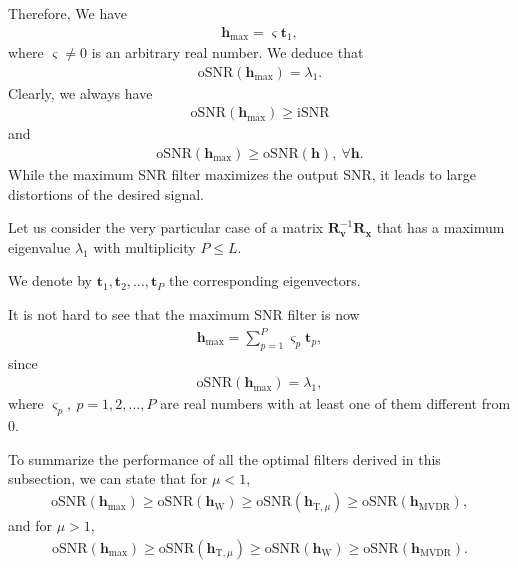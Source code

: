 \documentclass[10pt,pdflatex,headrule,landscape]{beamer}
\begin{document}
\begin{frame}[allowframebreaks]

Therefore, We have
\begin{eqnarray}
\label{C2-maxSNR-filt}
 \mathbf{h}_{\mathrm{max}} = \varsigma \mathbf{t}_1 ,
\end{eqnarray}
where $\varsigma \neq 0$ is an arbitrary real number. We deduce that
\begin{eqnarray}
 \mathrm{oSNR}\left( \mathbf{h}_{\mathrm{max}} \right) = \lambda_1 .
\end{eqnarray}
Clearly, we always have
\begin{eqnarray}
 \mathrm{oSNR}\left( \mathbf{h}_{\mathrm{max}} \right) \geq \mathrm{iSNR}
\end{eqnarray}
and
\begin{eqnarray}
 \mathrm{oSNR}\left( \mathbf{h}_{\mathrm{max}} \right) \geq \mathrm{oSNR}\left( \mathbf{h} \right), \ \forall \mathbf{h}.
\end{eqnarray}
While the maximum SNR filter maximizes the output SNR, it leads to large distortions of the desired signal.

Let us consider the very particular case of a matrix $\mathbf{R}_{\mathbf{v}}^{-1} \mathbf{R}_{\mathbf{x}}$ that has a maximum eigenvalue $\lambda_1$ with multiplicity $P \leq L$.

We denote by $\mathbf{t}_1, \mathbf{t}_2, \ldots, \mathbf{t}_P$ the corresponding eigenvectors.

It is not hard to see that the maximum SNR filter is now
\begin{eqnarray}
\label{C2-maxSNR-filt-P}
 \mathbf{h}_{\mathrm{max}} = \sum_{p=1}^P \varsigma_p \mathbf{t}_p ,
\end{eqnarray}
since
\begin{eqnarray}
 \mathrm{oSNR}\left( \mathbf{h}_{\mathrm{max}} \right) = \lambda_1 ,
\end{eqnarray}
where $\varsigma_p, \ p=1,2,\ldots,P$ are real numbers with at least one of them different from $0$.

\end{frame}
\begin{frame}[allowframebreaks]

To summarize the performance of all the optimal filters derived in this subsection, we can state that for $\mu < 1$,
\begin{eqnarray}
 \label{C2-snr_relation1}
 \mathrm{oSNR}\left( \mathbf{h}_{\mathrm{max}} \right) \geq \mathrm{oSNR}\left( \mathbf{h}_{\mathrm{W}} \right) \geq
 \mathrm{oSNR} \left( \mathbf{h}_{\mathrm{T},\mu} \right) \geq \mathrm{oSNR}\left( \mathbf{h}_{\mathrm{MVDR}} \right) ,
\end{eqnarray}
and for $\mu > 1$,
\begin{eqnarray}
 \label{C2-snr_relation2}
 \mathrm{oSNR}\left( \mathbf{h}_{\mathrm{max}} \right) \geq \mathrm{oSNR} \left( \mathbf{h}_{\mathrm{T},\mu} \right) \geq
 \mathrm{oSNR}\left( \mathbf{h}_{\mathrm{W}} \right) \geq \mathrm{oSNR}\left( \mathbf{h}_{\mathrm{MVDR}} \right) .
\end{eqnarray}

\end{frame}
\end{document}
